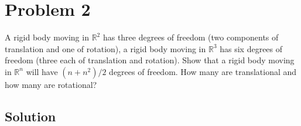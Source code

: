\section*{Problem 2}

A rigid body moving in \( \mathbb{R}^{2} \) has three degrees of freedom (two components of translation and one of rotation), a rigid body moving in \( \mathbb{R}^{3} \) has six degrees of freedom (three each of translation and rotation).
Show that a rigid body moving in \( \mathbb{R}^{n} \) will have \( \left(n+n^{2}\right) / 2 \) degrees of freedom.
How many are translational and how many are rotational?

\subsection*{Solution}
